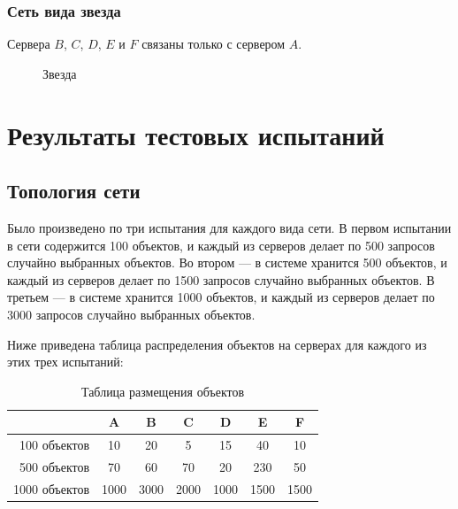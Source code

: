 			\subsubsection{Сеть вида звезда} 
				Сервера $B$, $C$, $D$, $E$ и $F$ связаны только с сервером $A$. 
				\begin{figure}[H] 
					\centering 
					\caption{Звезда} 
				\end{figure} 
		
	\section{Результаты тестовых испытаний}		
		\subsection{Топология сети}
			Было произведено по три испытания для каждого вида сети. В первом испытании в сети содержится 100 объектов, и каждый из серверов делает по 500 запросов случайно выбранных объектов.
			Во втором --- в системе хранится 500 объектов, и каждый из серверов делает по 1500 запросов случайно выбранных объектов. В третьем --- в системе хранится 1000 объектов, и каждый из серверов 
			делает по 3000 запросов случайно выбранных объектов. 
			
			Ниже приведена таблица распределения объектов на серверах для каждого из этих трех испытаний:
		
			\begin{table}[H]
				\small
				\centering
				\caption{Таблица размещения объектов}
				\begin{tabular} {|r|c|c|c|c|c|c|}
					\hline
						& A	    & B      & C      & D      & E     & F      \\
					\hline
	100 объектов		& 10    & 20     & 5      & 15     & 40    & 10     \\
	500 объектов		& 70	& 60	 & 70     & 20     & 230   & 50     \\
	1000 объектов		& 1000  & 3000   & 2000   & 1000   & 1500  & 1500   \\
					\hline
				\end{tabular}
			\end{table}
		

